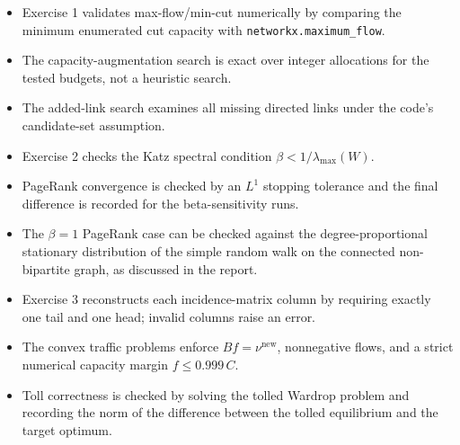 \documentclass[11pt,a4paper]{article}
\begin{document}
\begin{itemize}
    \item Exercise 1 validates max-flow/min-cut numerically by comparing the minimum enumerated cut capacity with \texttt{networkx.maximum\_flow}.
    \item The capacity-augmentation search is exact over integer allocations for the tested budgets, not a heuristic search.
    \item The added-link search examines all missing directed links under the code's candidate-set assumption.
    \item Exercise 2 checks the Katz spectral condition $\beta<1/\lambda_{\max}(W)$.
    \item PageRank convergence is checked by an $L^1$ stopping tolerance and the final difference is recorded for the beta-sensitivity runs.
    \item The $\beta=1$ PageRank case can be checked against the degree-proportional stationary distribution of the simple random walk on the connected non-bipartite graph, as discussed in the report.
    \item Exercise 3 reconstructs each incidence-matrix column by requiring exactly one tail and one head; invalid columns raise an error.
    \item The convex traffic problems enforce $Bf=\nu^{\mathrm{new}}$, nonnegative flows, and a strict numerical capacity margin $f\leq 0.999\,C$.
    \item Toll correctness is checked by solving the tolled Wardrop problem and recording the norm of the difference between the tolled equilibrium and the target optimum.
\end{itemize}
\end{document}

